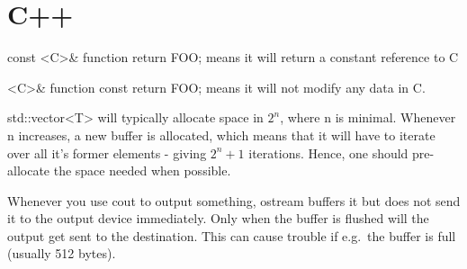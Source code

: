 \section{C++}

const <C>\& function { return FOO; }
means it will return a constant reference to C

<C>\& function const { return FOO; }
means it will not modify any data in C.


std::vector<T> will typically allocate space in $2^{n}$, where n is minimal.
Whenever n increases, a new buffer is allocated, which means that it will
have to iterate over all it's former elements - giving ${2^n+1}$ iterations.
Hence, one should pre-allocate the space needed when possible.

Whenever you use cout to output something, ostream buffers it but does not send
it to the output device immediately. Only when the buffer is flushed will the
output get sent to the destination. This can cause trouble if e.g.\
the buffer is full (usually 512 bytes).
